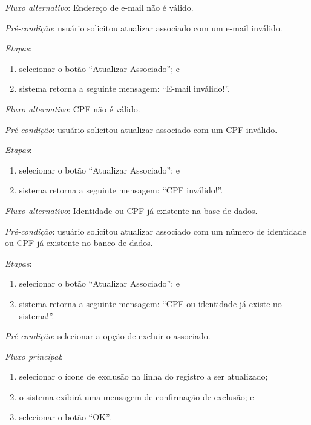 \documentclass[a4paper,12pt]{article}
\begin{document}
\noindent \textit{Fluxo alternativo}: Endereço de e-mail não é válido.

\noindent \textit{Pré-condição}: usuário solicitou atualizar associado com um e-mail inválido.

\noindent \textit{Etapas}:

\begin{enumerate}
    \item selecionar o botão ``Atualizar Associado''; e
    \item sistema retorna a seguinte mensagem: ``E-mail inválido!''.
\end{enumerate}


\noindent \textit{Fluxo alternativo}: CPF não é válido.

\noindent \textit{Pré-condição}: usuário solicitou atualizar associado com um CPF inválido.

\noindent \textit{Etapas}:

\begin{enumerate}
    \item selecionar o botão ``Atualizar Associado''; e
    \item sistema retorna a seguinte mensagem: ``CPF inválido!''.
\end{enumerate}


\noindent \textit{Fluxo alternativo}: Identidade ou CPF já existente na base de dados.

\noindent \textit{Pré-condição}: usuário solicitou atualizar associado com um número de identidade ou CPF já existente no banco de dados.

\noindent \textit{Etapas}:

\begin{enumerate}
    \item selecionar o botão ``Atualizar Associado''; e
    \item sistema retorna a seguinte mensagem: ``CPF ou identidade já existe no sistema!''.
\end{enumerate}



\vspace{0.7cm}

\noindent \textit{Pré-condição}: selecionar a opção de excluir o associado.

\noindent \textit{Fluxo principal}:

\begin{enumerate}
    \item selecionar o ícone de exclusão na linha do registro a ser atualizado;
    \item o sistema exibirá uma mensagem de confirmação de exclusão; e
    \item selecionar o botão ``OK''.
\end{enumerate}
\end{document}
